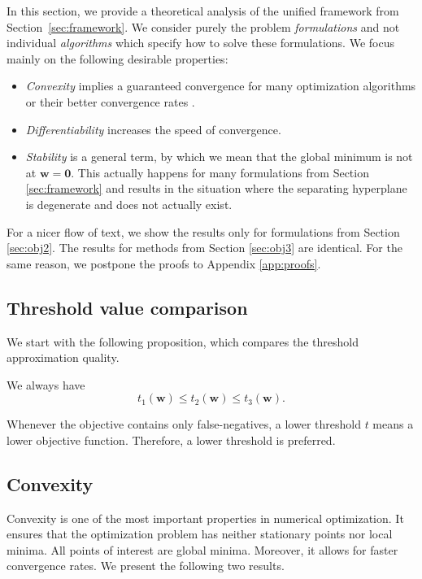 In this section, we provide a theoretical analysis of the unified framework from Section~\ref{sec:framework}. We consider purely the problem \textit{formulations} and not individual \textit{algorithms} which specify how to solve these formulations. We focus mainly on the following desirable properties:
\begin{itemize}
  \item \textit{Convexity} implies a guaranteed convergence for many optimization algorithms or their better convergence rates \cite{boyd2004convex}.
  \item \textit{Differentiability} increases the speed of convergence.
  \item \textit{Stability} is a general term, by which we mean that the global minimum is not at $\bm{w} = \bm{0}$. This actually happens for many formulations from Section \ref{sec:framework} and results in the situation where the separating hyperplane is degenerate and does not actually exist.
\end{itemize}
For a nicer flow of text, we show the results only for formulations from Section \ref{sec:obj2}. The results for methods from Section \ref{sec:obj3} are identical. For the same reason, we postpone the proofs to Appendix \ref{app:proofs}.

\subsection{Threshold value comparison}

We start with the following proposition, which compares the threshold approximation quality.

\begin{proposition}\label{prop:threholds}
  We always have
  \begin{equation*}
    t_1(\bm{w}) \le t_2(\bm{w}) \le t_3(\bm{w}).
  \end{equation*}
\end{proposition}

\noindent Whenever the objective contains only false-negatives, a lower threshold $t$ means a lower objective function. Therefore, a lower threshold is preferred.

\subsection{Convexity}\label{sec:convexity}

Convexity is one of the most important properties in numerical optimization. It ensures that the optimization problem has neither stationary points nor local minima. All points of interest are global minima. Moreover, it allows for faster convergence rates. We present the following two results.

